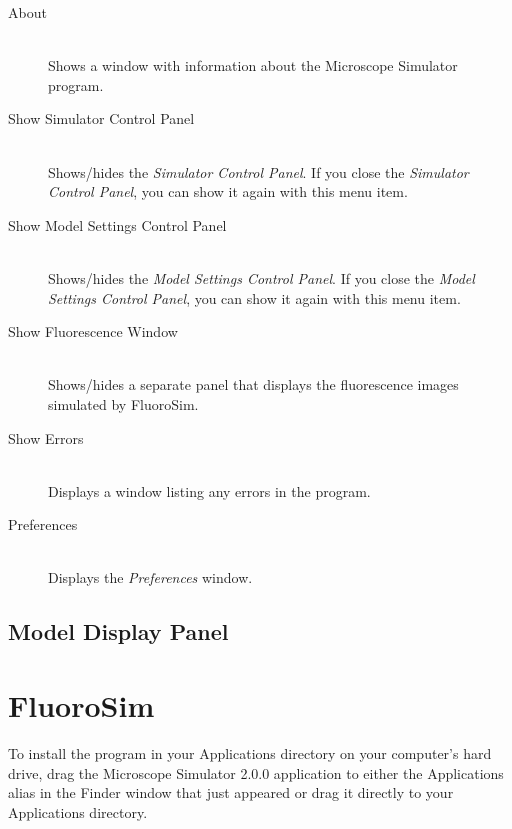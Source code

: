 \documentclass[11pt]{article}
\begin{document}
\begin{description}

  \item[About] \hfill \\
  Shows a window with information about the Microscope Simulator program.

  \item[Show Simulator Control Panel] \hfill \\
  Shows/hides the \emph{Simulator Control Panel}. If you close the \emph{Simulator Control Panel}, you can show it again with this menu item.
  
  \item[Show Model Settings Control Panel] \hfill \\
    Shows/hides the \emph{Model Settings Control Panel}. If you close the \emph{Model Settings Control Panel}, you can show it again with this menu item.
  
  \item[Show Fluorescence Window] \hfill \\
  Shows/hides a separate panel that displays the fluorescence images simulated by FluoroSim.
  
  \item[Show Errors] \hfill \\
  Displays a window listing any errors in the program.
  
  \item[Preferences] \hfill \\
  Displays the \emph{Preferences} window.

\end{description}

\subsection{Model Display Panel}

\section{FluoroSim}

To install the program in your Applications directory on your computer's hard drive, drag the Microscope Simulator 2.0.0 application to either the Applications alias in the Finder window that just appeared or drag it directly to your Applications directory.
\end{document}
